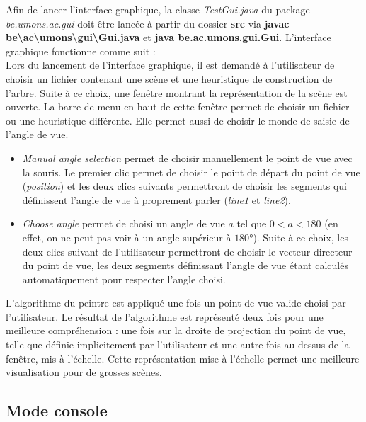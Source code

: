 \documentclass[11pt,a4paper]{article}
\theoremstyle{definition}
\theoremstyle{remark}
\begin{document}
Afin de lancer l'interface graphique, la classe \textit{TestGui.java} du package \textit{be.umons.ac.gui} doit être lancée à partir du dossier \textbf{src} via \textbf{javac be\textbackslash ac\textbackslash umons\textbackslash gui\textbackslash Gui.java} et \textbf{java be.ac.umons.gui.Gui}. L'interface graphique fonctionne comme suit : \\

Lors du lancement de l'interface graphique, il est demandé à l'utilisateur de choisir un fichier contenant une scène et une heuristique de construction de l'arbre. Suite à ce choix, une fenêtre montrant la représentation de la scène est ouverte. La barre de menu en haut de cette fenêtre permet de choisir un fichier ou une heuristique différente. Elle permet aussi de choisir le monde de  saisie de l'angle de vue.\\

\begin{itemize}
	\item \emph{Manual angle selection} permet de choisir manuellement le point de vue avec la souris. Le premier clic permet de choisir le point de départ du point de vue (\emph{position}) et les deux clics suivants permettront de choisir les segments qui définissent l'angle de vue à proprement parler (\emph{line1} et \emph{line2}).
	\item \emph{Choose angle} permet de choisi un angle de vue $a$ tel que $0<a<180$ (en effet, on ne peut pas voir à un angle supérieur à $180°$). Suite à ce choix, les deux clics suivant de l'utilisateur permettront de choisir le vecteur directeur du point de vue, les deux segments définissant l'angle de vue étant calculés automatiquement pour respecter l'angle choisi.
\end{itemize}
\vspace{20}

L'algorithme du peintre est appliqué une fois un point de vue valide choisi par l'utilisateur. Le résultat de l'algorithme est représenté deux fois pour une meilleure compréhension : une fois sur la droite de projection du point de vue, telle que définie implicitement par l'utilisateur et une autre fois au dessus de la fenêtre, mis à l'échelle. Cette représentation mise à l'échelle permet une meilleure visualisation pour de grosses scènes.

\subsection{Mode console}
\end{document}
